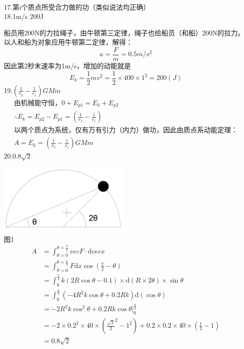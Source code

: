 \documentclass[blue, normal]{./templete/qyxfnote}
\newcommand{\di}[1]{\mathrm{d}#1}
\begin{document}
\begin{multicols}{2}
\begin{gather}
	\end{gather}
	17.第i个质点所受合力做的功（类似说法均正确）\\
	18.1m/s \qquad 200J\par
	船员用200N的力拉绳子，由牛顿第三定律，绳子也给船员（和船）200N的拉力。以人和船为对象应用牛顿第二定律，解得：
	\[a=\frac{F}{m}=0.5m/s^2\]
	因此第2秒末速率为1m/s，增加的动能就是
	\[E_k=\frac{1}{2}mv^2=\frac{1}{2}\times400\times1^2=200(J)\]
	19.$\left(\frac{1}{r_2}-\frac{1}{r_1}\right)GMm$ 
	\begin{gather*}
	\text{由机械能守恒，}0+E_{p1}=E_k+E_{p2}\\
	\therefore E_k=E_{p2}-E_{p1}=\left(\frac{1}{r_2}-\frac{1}{r_1}\right)\\
	\text{以两个质点为系统，仅有万有引力（内力）做功，因此由质点系动能定理：}\\
	A=E_k=\left(\frac{1}{r_2}-\frac{1}{r_1}\right)GMm
	\end{gather*}
	20.$0.8\sqrt{2}$\par
	\centering\includegraphics[height=100pt]{Chp2_illus1.png}\\
	图1
	\begin{align*}
	A	&=\int_{\theta=0}^{\theta=\frac{\pi}{4}}{vec{F}}\cdot\di{vec{x}}\\
	&=\int_{\theta=0}^{\theta=\frac{\pi}{4}}F\di{x}\cos\left(\frac{\pi}{2}-\theta\right)\\
	&=\int_{0}^{\frac{\pi}{4}}k(2R\cos\theta-0.1)\times\di{(R\times 2\theta)}\times\sin\theta\\
	&=\int_{0}^{\frac{\pi}{4}}(-4R^2k\cos\theta+0.2Rk)\di{(\cos\theta)}\\
	&=-2R^2k\cos^2\theta+0.2Rk\cos\theta\left.\right|_0^{\frac{\pi}{4}}\\
	&=-2\times 0.2^2\times 40\times({\frac{\sqrt{2}}{2}}^2-1^2)+0.2\times 0.2\times 40\times(\frac{1}{2}-1)\\
	&=0.8\sqrt{2}
	\end{align*}
	\raggedright

\end{multicols}
\end{document}
